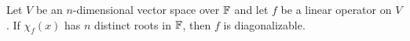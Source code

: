 \begin{propbox}
\label{prop:n-distinct-eigenvalues}
Let $V$ be an $n$-dimensional vector space over $\mathbb{F}$ and let $f$ be a
linear operator on $V$.  If $\chi_f(x)$ has $n$ distinct roots in $\mathbb{F}$,
then $f$ is diagonalizable.
\end{propbox}
